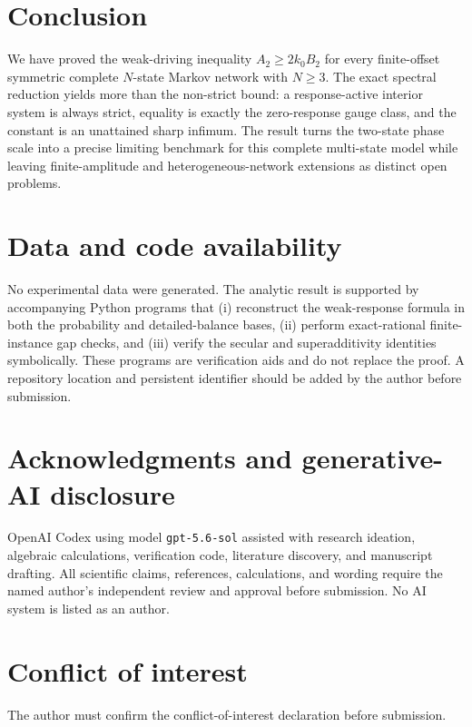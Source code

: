 \documentclass[11pt]{article}
\begin{document}
\section{Conclusion}

We have proved the weak-driving inequality $A_2\geq2k_0B_2$ for every finite-offset
symmetric complete $N$-state Markov network with $N\geq3$.  The exact spectral
reduction yields more than the non-strict bound: a response-active interior system is
always strict, equality is exactly the zero-response gauge class, and the constant is
an unattained sharp infimum.  The result turns the two-state phase scale into a precise
limiting benchmark for this complete multi-state model while leaving finite-amplitude
and heterogeneous-network extensions as distinct open problems.

\section*{Data and code availability}

No experimental data were generated.  The analytic result is supported by accompanying
Python programs that (i) reconstruct the weak-response formula in both the probability
and detailed-balance bases, (ii) perform exact-rational finite-instance gap checks, and
(iii) verify the secular and superadditivity identities symbolically.  These programs
are verification aids and do not replace the proof.  A repository location and
persistent identifier should be added by the author before submission.

\section*{Acknowledgments and generative-AI disclosure}

OpenAI Codex using model \texttt{gpt-5.6-sol} assisted with research ideation, algebraic calculations,
verification code, literature discovery, and manuscript drafting.  All scientific
claims, references, calculations, and wording require the named author's independent
review and approval before submission.  No AI system is listed as an author.

\section*{Conflict of interest}

The author must confirm the conflict-of-interest declaration before submission.



\end{document}
